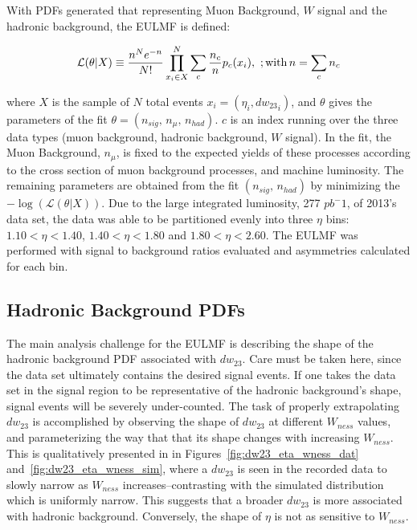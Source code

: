 {\noindent}With PDFs generated that representing Muon Background, $W$ signal and
the hadronic background, the EULMF is defined:

\begin{equation} 
  \mathcal{L}(\theta|X) 
  \equiv
  \frac{n^N e^{-n}}{N!} \prod_{x_i \in X}^N
  \sum_c \frac{n_c}{n} p_c (x_i), \
  ;{\rm with}\, 
  n=\sum_c n_c 
  \label{eq:likelihood_function}
\end{equation} 

{\noindent}where $X$ is the sample of $N$ total events $x_i =
(\eta_i,{dw_{23}}_i)$, and $\theta$ gives the parameters of the fit $\theta =
(n_{sig},\,n_\mu,\, n_{had})$. $c$ is an index running over the three data types
(muon background, hadronic background, $W$ signal). In the fit, the Muon
Background, $n_\mu$, is fixed to the expected yields of these processes
according to the cross section of muon background processes, and machine
luminosity. The remaining parameters are obtained from the fit $(n_{sig},\,
n_{had})$ by minimizing the $-\log(\mathcal{L}(\theta|X))$. Due to the large
integrated luminosity, 277 $pb^-1$, of 2013's data set, the data was able to be
partitioned evenly into three $\eta$ bins: $1.10 < \eta < 1.40$, $1.40 < \eta <
1.80$ and $1.80 < \eta < 2.60$. The EULMF was performed with signal to
background ratios evaluated and asymmetries calculated for each bin.

\subsection{Hadronic Background PDFs}
\label{sec:hadronic_background_pdfs}
The main analysis challenge for the EULMF is describing the shape of the
hadronic background PDF associated with $dw_{23}$. Care must be taken here,
since the data set ultimately contains the desired signal events. If one takes
the data set in the signal region to be representative of the hadronic
background's shape, signal events will be severely under-counted. The task of
properly extrapolating $dw_{23}$ is accomplished by observing the shape of
$dw_{23}$ at different $W_{ness}$ values, and parameterizing the way that that
its shape changes with increasing $W_{ness}$. This is qualitatively presented in
in Figures~\ref{fig:dw23_eta_wness_dat} and~\ref{fig:dw23_eta_wness_sim}, where
a $dw_{23}$ is seen in the recorded data to slowly narrow as $W_{ness}$
increases--contrasting with the simulated distribution which is uniformly
narrow. This suggests that a broader $dw_{23}$ is more associated with hadronic
background. Conversely, the shape of $\eta$ is not as sensitive to $W_{ness}$.

